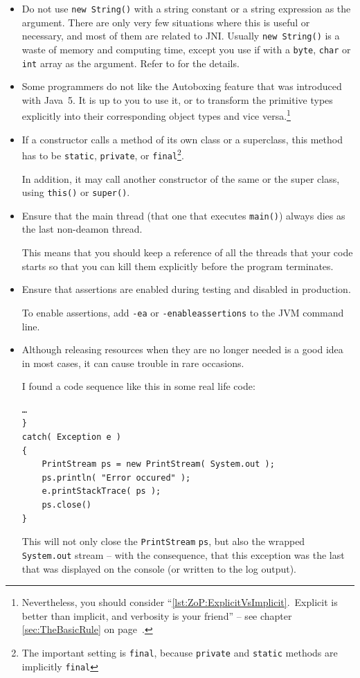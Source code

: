 \documentclass[11pt,a4paper, titlepage, parskip=half, headsepline, footsepline, cleardoublepage=current, headheight=1cm]{scrbook}
\newcommand*{\tqvref}[1]{\hyperref[{#1}]{\ref*{#1}} on page~\pageref{#1}}
\begin{document}
\begin{itemize}
\item{Do not use \lstinline|new String()| with a string constant or a string expression as the argument. There are only very few situations where this is useful or necessary, and most of them are related to JNI. Usually \lstinline|new String()| is a waste of memory and computing time, except you use if with a \lstinline|byte|, \lstinline|char| or \lstinline|int| array as the argument. Refer to \autocite{ORACLE_DOC_STRING_CLASS} for the details.}

\item{Some programmers do not like the Autoboxing feature that was introduced with Java~5. It is up to you to use it, or to transform the primitive types explicitly into their corresponding object types and vice versa.\footnote{Nevertheless, you should consider “\ref{lst:ZoP:ExplicitVsImplicit}.~Explicit is better than implicit, and verbosity is your friend” – see chapter \tqvref{sec:TheBasicRule}.}}

\item{If a constructor calls a method of its own class or a superclass, this method has to be \lstinline|static|, \lstinline|private|, or \lstinline|final|\footnote{The important setting is \lstinline|final|, because \lstinline|private| and \lstinline|static| methods are implicitly \lstinline|final|}.

In addition, it may call another constructor of the same or the super class, using \lstinline|this()| or \lstinline|super()|.}

\item{Ensure that the main thread (that one that executes \lstinline|main()|) always dies as the last non-deamon thread.

This means that you should keep a reference of all the threads that your code starts so that you can kill them explicitly before the program terminates.}

\item{Ensure that assertions\autocite{ORACLE_DOC_LANGUAGE_SPECIFICATION:Assert,ORACLE_DOC_ASSERTIONS} are enabled during testing and disabled in production.

To enable assertions, add \verb#-ea# or \verb#-enableassertions# to the JVM command line.}

\item{Although releasing resources when they are no longer needed is a good idea in most cases, it can cause trouble in rare occasions.

I found a code sequence like this in some real life code:
\begin{lstlisting}
…
}
catch( Exception e )
{
    PrintStream ps = new PrintStream( System.out );
    ps.println( "Error occured" );
    e.printStackTrace( ps );
    ps.close()
}
\end{lstlisting}
This will not only close the \lstinline|PrintStream| \lstinline|ps|, but also the wrapped \lstinline|System.out| stream – with the consequence, that this exception was the last that was displayed on the console (or written to the log output).

}
\end{itemize}
\end{document}
